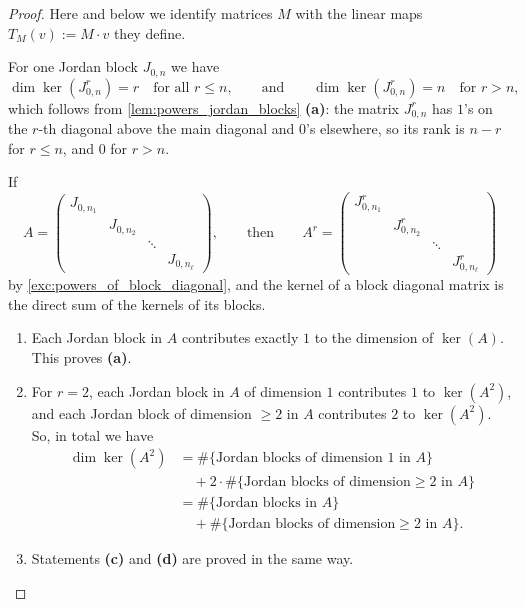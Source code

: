 \begin{proof}
Here and below we identify matrices $M$ with the linear maps $T_M(v) := M \cdot v$ they define.

For one Jordan block $J_{0,n}$ we have
\[
    \dim \ker\left(J_{0,n}^r\right) = r \quad \text{for all } r \le n, \qquad \text{and} \qquad \dim \ker\left(J_{0,n}^r\right) = n \quad \text{for } r > n,
\]
which follows from \cref{lem:powers_jordan_blocks} \textbf{(a)}: the matrix $J_{0,n}^r$ has $1$'s on the $r$-th diagonal above the main diagonal and $0$'s elsewhere, so its rank is $n-r$ for $r \le n$, and $0$ for $r > n$.

If
\[
    A = \begin{pmatrix} J_{0,n_1} & & & \\ & J_{0,n_2} & & \\ & & \ddots & \\ & & & J_{0,n_\ell} \end{pmatrix}, \qquad \text{then} \qquad A^r = \begin{pmatrix} J_{0,n_1}^r & & & \\ & J_{0,n_2}^r & & \\ & & \ddots & \\ & & & J_{0,n_\ell}^r \end{pmatrix}
\]
by \cref{exc:powers_of_block_diagonal}, and the kernel of a block diagonal matrix is the direct sum of the kernels of its blocks.

\begin{enumerate}[label=\textbf{(\alph*)}]
    \item Each Jordan block in $A$ contributes exactly $1$ to the dimension of $\ker(A)$. This proves \textbf{(a)}.
    \item For $r = 2$, each Jordan block in $A$ of dimension $1$ contributes $1$ to $\ker(A^2)$, and each Jordan block of dimension $\ge 2$ in $A$ contributes $2$ to $\ker(A^2)$. So, in total we have
    \begin{align*}
        \dim \ker(A^2) &= \#\{\text{Jordan blocks of dimension } 1 \text{ in } A\} \\
        &\quad + 2 \cdot \#\{\text{Jordan blocks of dimension} \ge 2 \text{ in } A\} \\
        &= \#\{\text{Jordan blocks in } A\} \\
        &\quad + \#\{\text{Jordan blocks of dimension} \ge 2 \text{ in } A\}.
    \end{align*}
    \item Statements \textbf{(c)} and \textbf{(d)} are proved in the same way.
\end{enumerate}
\end{proof}

